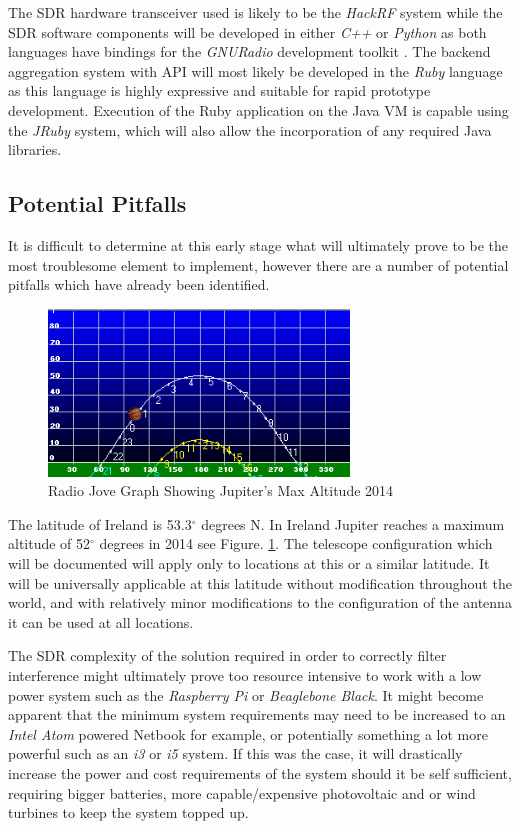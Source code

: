 \documentclass[runningheads,a4paper]{llncs}
\begin{document}
The \gls{SDR} hardware transceiver used is likely to be the \textit{HackRF} system while the \gls{SDR} software components will be developed in either \textit{C++} or \textit{Python} as both languages have bindings for the \textit{GNURadio} development toolkit \citep{gnuradio-14}. The backend aggregation system with API will most likely be developed in the \textit{Ruby} language as this language is highly expressive and suitable for rapid prototype development. Execution of the Ruby application on the Java VM is capable using the \textit{JRuby} system, which will also allow the incorporation of any required Java libraries.


\subsection*{Potential Pitfalls}

It is difficult to determine at this early stage what will ultimately prove to be the most troublesome element to implement, however there are a number of potential pitfalls which have already been identified.

%
\begin{figure}[here]
\centering
\includegraphics[width=8cm]{images/11}
\caption{Radio Jove Graph Showing Jupiter's Max Altitude 2014 \citep{rjp-14}}
\label{fig:jupiter_max_altitude_2014}
\end{figure}
%

The latitude of Ireland is 53.3$^{\circ}$ degrees N. In Ireland Jupiter reaches a maximum altitude of 52$^{\circ}$ degrees in 2014 see Figure. \ref{fig:jupiter_max_altitude_2014}. The telescope configuration which will be documented will apply only to locations at this or a similar latitude. It will be universally applicable at this latitude without modification throughout the world, and with relatively minor modifications to the configuration of the antenna it can be used at all locations. \cite{nasa12}

The \gls{SDR} complexity of the solution required in order to correctly filter interference might ultimately prove too resource intensive to work with a low power system such as the \textit{Raspberry Pi} or \textit{Beaglebone Black}. It might become apparent that the minimum system requirements may need to be increased to an \textit{Intel Atom} powered Netbook for example, or potentially something a lot more powerful such as an \textit{i3} or \textit{i5} system. If this was the case, it will drastically increase the power and cost requirements of the system should it be self sufficient, requiring bigger batteries, more capable/expensive photovoltaic and or wind turbines to keep the system topped up.
\end{document}
